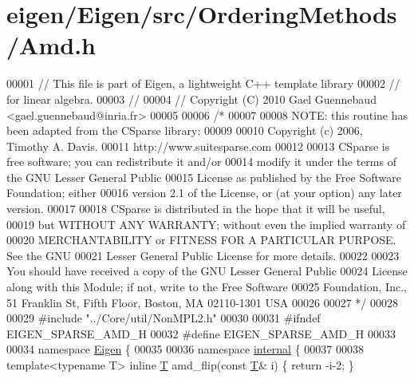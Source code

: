 \hypertarget{eigen_2_eigen_2src_2_ordering_methods_2_amd_8h_source}{}\section{eigen/\+Eigen/src/\+Ordering\+Methods/\+Amd.h}
\label{eigen_2_eigen_2src_2_ordering_methods_2_amd_8h_source}

\begin{DoxyCode}
00001 \textcolor{comment}{// This file is part of Eigen, a lightweight C++ template library}
00002 \textcolor{comment}{// for linear algebra.}
00003 \textcolor{comment}{//}
00004 \textcolor{comment}{// Copyright (C) 2010 Gael Guennebaud <gael.guennebaud@inria.fr>}
00005 
00006 \textcolor{comment}{/*}
00007 \textcolor{comment}{}
00008 \textcolor{comment}{NOTE: this routine has been adapted from the CSparse library:}
00009 \textcolor{comment}{}
00010 \textcolor{comment}{Copyright (c) 2006, Timothy A. Davis.}
00011 \textcolor{comment}{http://www.suitesparse.com}
00012 \textcolor{comment}{}
00013 \textcolor{comment}{CSparse is free software; you can redistribute it and/or}
00014 \textcolor{comment}{modify it under the terms of the GNU Lesser General Public}
00015 \textcolor{comment}{License as published by the Free Software Foundation; either}
00016 \textcolor{comment}{version 2.1 of the License, or (at your option) any later version.}
00017 \textcolor{comment}{}
00018 \textcolor{comment}{CSparse is distributed in the hope that it will be useful,}
00019 \textcolor{comment}{but WITHOUT ANY WARRANTY; without even the implied warranty of}
00020 \textcolor{comment}{MERCHANTABILITY or FITNESS FOR A PARTICULAR PURPOSE.  See the GNU}
00021 \textcolor{comment}{Lesser General Public License for more details.}
00022 \textcolor{comment}{}
00023 \textcolor{comment}{You should have received a copy of the GNU Lesser General Public}
00024 \textcolor{comment}{License along with this Module; if not, write to the Free Software}
00025 \textcolor{comment}{Foundation, Inc., 51 Franklin St, Fifth Floor, Boston, MA  02110-1301  USA}
00026 \textcolor{comment}{}
00027 \textcolor{comment}{*/}
00028 
00029 \textcolor{preprocessor}{#include "../Core/util/NonMPL2.h"}
00030 
00031 \textcolor{preprocessor}{#ifndef EIGEN\_SPARSE\_AMD\_H}
00032 \textcolor{preprocessor}{#define EIGEN\_SPARSE\_AMD\_H}
00033 
00034 \textcolor{keyword}{namespace }\hyperlink{namespace_eigen}{Eigen} \{ 
00035 
00036 \textcolor{keyword}{namespace }\hyperlink{namespaceinternal}{internal} \{
00037   
00038 \textcolor{keyword}{template}<\textcolor{keyword}{typename} T> \textcolor{keyword}{inline} \hyperlink{group___sparse_core___module_class_eigen_1_1_triplet}{T} amd\_flip(\textcolor{keyword}{const} \hyperlink{group___sparse_core___module_class_eigen_1_1_triplet}{T}& i) \{ \textcolor{keywordflow}{return} -i-2; \}

\end{DoxyCode}

